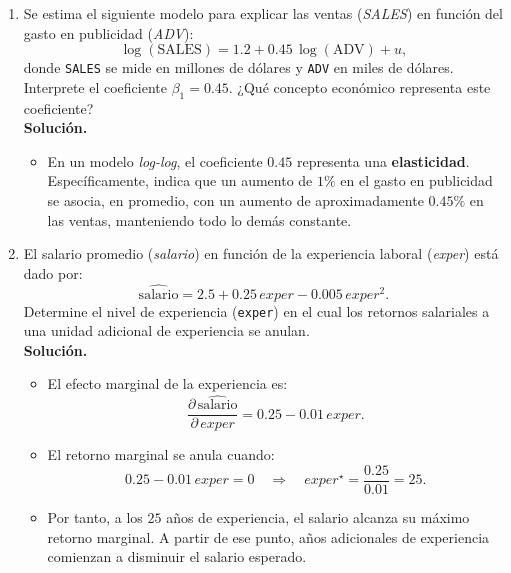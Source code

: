 \documentclass[10pt,a4paper]{article}
\begin{document}
\begin{enumerate}
    \item Se estima el siguiente modelo para explicar las ventas (\emph{SALES})
        en función del gasto en publicidad (\emph{ADV}):
        \[
          \log(\text{SALES})
          = 1.2 + 0.45\,\log(\text{ADV}) + u ,
        \]
        donde \texttt{SALES} se mide en millones de dólares y \texttt{ADV}
        en miles de dólares. Interprete el coeficiente \(\beta_1 = 0.45\). ¿Qué concepto económico representa este coeficiente?\\

        \textbf{Solución.}
        \begin{itemize}
          \item En un modelo \emph{log-log}, el coeficiente \(0.45\)
                representa una \textbf{elasticidad}.
                Específicamente, indica que un aumento de \(1\%\) en el gasto
                en publicidad se asocia, en promedio, con un aumento de
                aproximadamente \(0.45\%\) en las ventas, manteniendo todo
                lo demás constante.
        \end{itemize}
        
\item El salario promedio (\emph{salario}) en función de la experiencia laboral
        (\emph{exper}) está dado por:
        \[
          \widehat{\text{salario}}
          = 2.5 + 0.25\,exper - 0.005\,exper^2 .
        \]
        Determine el nivel de experiencia (\texttt{exper}) en el cual los
                retornos salariales a una unidad adicional de experiencia
                se anulan.
 \\
 \textbf{Solución.}
        \begin{itemize}
          \item El efecto marginal de la experiencia es:
                \[
                  \frac{\partial\,\widehat{\text{salario}}}{\partial\,exper}
                  = 0.25 - 0.01\,exper.
                \]
          \item El retorno marginal se anula cuando:
                \[
                  0.25 - 0.01\,exper = 0
                  \quad\Rightarrow\quad
                  exper^\star = \frac{0.25}{0.01} = 25.
                \]
          \item Por tanto, a los \(25\) años de experiencia,
                el salario alcanza su máximo retorno marginal.
                A partir de ese punto, años adicionales de experiencia
                comienzan a disminuir el salario esperado.
        \end{itemize}


\end{enumerate}
\end{document}
